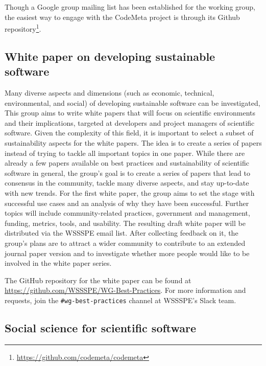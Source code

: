 \documentclass[11pt, oneside]{amsart}
\newcommand{\note}[1]{ {\textcolor{blueish}    { ***Note:      #1 }}}
\begin{document}
Though a Google group mailing list has been established for the working group, the easiest way to engage with the CodeMeta project is through its Github repository\footnote{\url{https://github.com/codemeta/codemeta}}.


\subsection{White paper on developing sustainable software}
\label{sec:best-practices-developing}


Many diverse aspects and dimensions (such as economic, technical, environmental, and social) of developing sustainable software can be investigated,
This group aims to write white papers
that will focus on scientific environments and their implications, targeted at developers
and project managers of scientific software. Given the complexity of this field, it is important to select
a subset of sustainability aspects for the white papers. The idea is to create a series of papers instead of trying
to tackle all important topics in one paper.
%
While there are already a few papers available on best practices and sustainability of scientific software in general, the group's goal is to create a series of papers that lead to consensus in the community, tackle many diverse aspects, and stay up-to-date with new trends.
%
For the first white paper, the group aims to set the
stage with successful use cases and an analysis of why they have been successful.
Further topics will include community-related practices, government and management, funding,
metrics, tools, and usability.
The resulting draft white paper will be distributed via the WSSSPE email list. After collecting feedback on it, the group's plans are to attract a wider community to contribute to an extended journal paper version and to investigate whether more people would like to be involved in the white paper series.

The GitHub repository for the white paper can be found at \url{https://github.com/WSSSPE/WG-Best-Practices}. For more information and requests, join the \texttt{\#wg-best-practices} channel at WSSSPE's Slack team.



\subsection{Social science for scientific software}
\label{sec:social}
\end{document}

